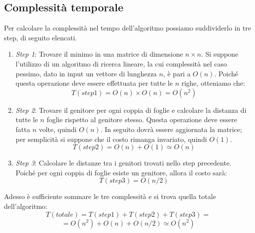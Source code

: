 \subsection{Complessità temporale}
Per calcolare la complessità nel tempo dell'algoritmo possiamo suddividerlo in tre step, di seguito elencati.
\begin{enumerate}
	\item \textit{Step 1}: Trovare il minimo in una matrice di dimensione $n \times n$.
	\newline
	Si suppone l'utilizzo di un algoritmo di ricerca lineare, la cui complessità nel caso pessimo, dato in input un vettore di lunghezza $n$, è pari a $O(n)$. Poiché questa operazione deve essere effettuata per tutte le $n$ righe, otteniamo che:
	\[T(step 1)=O(n) \times O(n) = O(n^2)\]
	\item \textit{Step 2}: Trovare il genitore per ogni coppia di foglie e calcolare la distanza di tutte le $n$ foglie  rispetto al genitore stesso.
	\newline
	Questa operazione deve essere fatta $n$ volte, quindi $O(n)$. In seguito dovrà essere aggiornata la matrice; per semplicità si suppone che il costo rimanga invariato, quindi $O(1)$.
	\[T(step 2)=O(n)+O(1) \simeq O(n)\]
	\item \textit{Step 3}: Calcolare le distanze tra i genitori trovati nello step precedente.
	\newline
	Poiché per ogni coppia di foglie esiste un genitore, allora il costo sarà:
	\[T(step 3)=O(n/2)\]
\end{enumerate}
Adesso è sufficiente sommare le tre complessità e si trova quella totale dell'algoritmo:
\[T(totale)=T(step 1)+T(step 2)+T(step 3)=\]
\[=O(n^2)+O(n)+O(n/2) \simeq O(n^2) \]

\newpage

